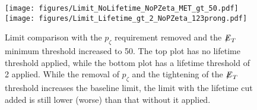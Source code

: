 \begin{figure}[tbh!]
\centering
\texttt{[image: figures/Limit\_NoLifetime\_NoPZeta\_MET\_gt\_50.pdf]}
\texttt{[image: figures/Limit\_Lifetime\_gt\_2\_NoPZeta\_123prong.pdf]}
\caption{Limit comparison with the $p_\zeta$ requirement removed and the ${\not\mathrel{E}}_T$ minimum threshold increased to 50. The top plot has no lifetime threshold applied, while the bottom plot has a lifetime threshold of 2 applied. While the removal of $p_\zeta$ and the tightening of the ${\not\mathrel{E}}_T$ threshold increases the baseline limit, the limit with the lifetime cut added is still lower (worse) than that without it applied.}
\label{fig:13TeVImprovedLimits}
\end{figure}
